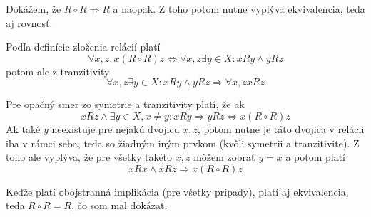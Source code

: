 
Dokážem, že $R\circ R\Rightarrow R$ a naopak. Z toho potom nutne 
vyplýva ekvivalencia, teda aj rovnosť.

Podľa definície zloženia relácií platí
\[\forall x,z: x(R\circ R)z\Leftrightarrow\forall x,z \exists y\in X: 
xRy\wedge yRz\]
potom ale z tranzitivity
\[\forall x,z\exists y\in X: xRy\wedge yRz\Rightarrow \forall x,z xRz\]

Pre opačný smer zo symetrie a tranzitivity platí, že ak
\[xRz\wedge\exists y\in X, x\neq y: xRy\Rightarrow yRz\Leftrightarrow 
x(R\circ R)z\]
Ak také $y$ neexistuje pre nejakú dvojicu $x, z$, potom nutne je táto 
dvojica v relácii iba v rámci seba, teda so žiadným iným prvkom (kvôli 
symetrii a tranzitivite). Z toho ale vyplýva, že pre všetky takéto 
$x, z$ môžem zobrať $y=x$ a potom platí 
\[xRx\wedge xRz\Rightarrow x(R\circ R)z\]

Keďže platí obojstranná implikácia (pre všetky prípady), platí aj 
ekvivalencia, teda $R\circ R=R$, čo som mal dokázať.

